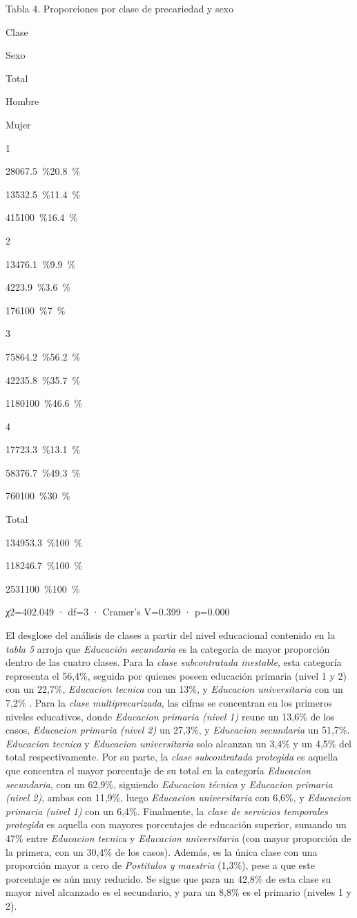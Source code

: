 \documentclass[
]{article}
\begin{document}
Tabla 4. Proporciones por clase de precariedad y sexo

Clase

Sexo

Total

Hombre

Mujer

1

{280}{67.5~\%}{20.8~\%}

{135}{32.5~\%}{11.4~\%}

{415}{100~\%}{16.4~\%}

2

{134}{76.1~\%}{9.9~\%}

{42}{23.9~\%}{3.6~\%}

{176}{100~\%}{7~\%}

3

{758}{64.2~\%}{56.2~\%}

{422}{35.8~\%}{35.7~\%}

{1180}{100~\%}{46.6~\%}

4

{177}{23.3~\%}{13.1~\%}

{583}{76.7~\%}{49.3~\%}

{760}{100~\%}{30~\%}

Total

{1349}{53.3~\%}{100~\%}

{1182}{46.7~\%}{100~\%}

{2531}{100~\%}{100~\%}

χ2=402.049 · df=3 · Cramer's V=0.399 · p=0.000

El desglose del análisis de clases a partir del nivel educacional
contenido en la \emph{tabla 5} arroja que \emph{Educación secundaria} es
la categoría de mayor proporción dentro de las cuatro clases. Para la
\emph{clase subcontratada inestable}, esta categoría representa el
56,4\%, seguida por quienes poseen educación primaria (nivel 1 y 2) con
un 22,7\%, \emph{Educacion tecnica} con un 13\%, y \emph{Educacion
universitaria} con un 7,2\% . Para la \emph{clase multiprecarizada}, las
cifras se concentran en los primeros niveles educativos, donde
\emph{Educacion primaria (nivel 1)} reune un 13,6\% de los casos,
\emph{Educacion primaria (nivel 2)} un 27,3\%, y \emph{Educacion
secundaria} un 51,7\%. \emph{Educacion tecnica} y \emph{Educacion
universitaria} solo alcanzan un 3,4\% y un 4,5\% del total
respectivamente. Por su parte, la \emph{clase subcontratada protegida}
es aquella que concentra el mayor porcentaje de su total en la categoría
\emph{Educacion secundaria}, con un 62,9\%, siguiendo \emph{Educacion
técnica} y \emph{Educacion primaria (nivel 2)}, ambas con 11,9\%, luego
\emph{Educacion universitaria} con 6,6\%, y \emph{Educacion primaria
(nivel 1)} con un 6,4\%. Finalmente, la \emph{clase de servicios
temporales protegida} es aquella con mayores porcentajes de educación
superior, sumando un 47\% entre \emph{Educacion tecnica} y
\emph{Educacion universitaria} (con mayor proporción de la primera, con
un 30,4\% de los casos). Además, es la única clase con una proporción
mayor a cero de \emph{Postitulos y maestria} (1,3\%), pese a que este
porcentaje es aún muy reducido. Se sigue que para un 42,8\% de esta
clase su mayor nivel alcanzado es el secundario, y para un 8,8\% es el
primario (niveles 1 y 2).
\end{document}
